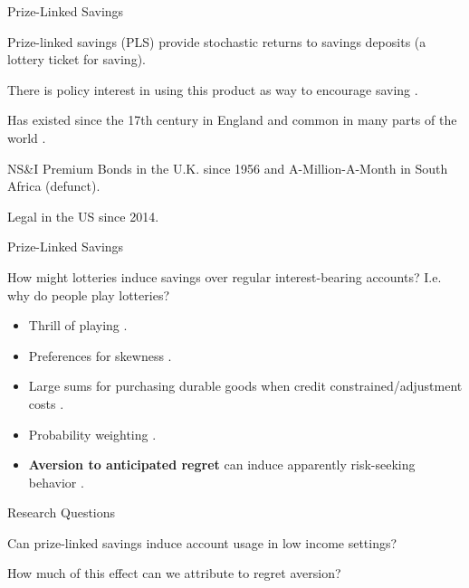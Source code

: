 \documentclass[aspectratio=169]{beamer}
\newenvironment{wideitemize}{\itemize\addtolength{\itemsep}{10pt}}{\enditemize}
\newenvironment{wideenumerate}{\enumerate\addtolength{\itemsep}{10pt}}{\endenumerate}
\begin{document}
\begin{frame}{Prize-Linked Savings}

	\begin{wideitemize}
		\item Prize-linked savings (PLS) provide stochastic returns to savings deposits (a lottery ticket for saving).
		\begin{wideitemize}
			\item There is policy interest in using this product as way to encourage saving \parencite{kearney_making_2010}.
			\item Has existed since the 17th century in England and common in many parts of the world \parencite{kearney_making_2010}.
			\item NS\&I Premium Bonds in the U.K. since 1956 and A-Million-A-Month in South Africa (defunct).
			\item Legal in the US since 2014.
		\end{wideitemize}
	\end{wideitemize}

\end{frame}

\begin{frame}{Prize-Linked Savings}

	How might lotteries induce savings over regular interest-bearing accounts? I.e. why do people play lotteries?

	\begin{itemize}
		\item Thrill of playing \parencite{conlisk_utility_1993}.
		\item Preferences for skewness \parencite{garrett_gamblers_1999}.
		\item Large sums for purchasing durable goods when credit constrained/adjustment costs \parencite{herskowitz_gambling_2016}.
		\item Probability weighting \parencite{kahneman_advances_1992}.
		\item \textbf{Aversion to anticipated regret} can induce apparently risk-seeking behavior \parencite{loomes_regret_1982,bell_risk_1983,zeelenberg_consequences_1996}.
	\end{itemize}

\end{frame}

\begin{frame}{Research Questions}

	\begin{wideenumerate}

		\item Can prize-linked savings induce account usage in low income settings?
		\item How much of this effect can we attribute to regret aversion?

	\end{wideenumerate}

\end{frame}
\end{document}

